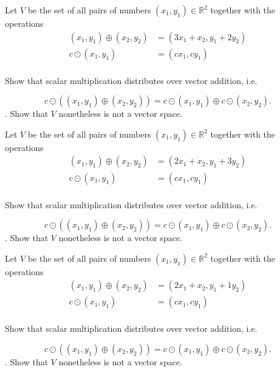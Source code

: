 \documentclass{article}
\begin{document}
\begin{exerciseStatement}
    Let \(V\) be the set of all pairs of numbers \((x_1,y_1)\in\mathbb{R}^2\)  together with the operations
\begin{align*}
(x_1,y_1)\oplus (x_2,y_2)&= (3x_1+x_2, y_1+2y_2)\\
c \odot (x_1,y_1) &= (cx_1,cy_1)\\
\end{align*}

Show that scalar multiplication distributes over vector addition, i.e.

\[c\odot \left((x_1,y_1)\oplus(x_2,y_2)\right)=c\odot(x_1,y_1)\oplus c\odot(x_2,y_2).\]
.
Show that \(V\) nonetheless is not a vector space.



  
\end{exerciseStatement}

\begin{exerciseStatement}
    Let \(V\) be the set of all pairs of numbers \((x_1,y_1)\in\mathbb{R}^2\)  together with the operations
\begin{align*}
(x_1,y_1)\oplus (x_2,y_2)&= (2x_1+x_2, y_1+3y_2)\\
c \odot (x_1,y_1) &= (cx_1,cy_1)\\
\end{align*}

Show that scalar multiplication distributes over vector addition, i.e.

\[c\odot \left((x_1,y_1)\oplus(x_2,y_2)\right)=c\odot(x_1,y_1)\oplus c\odot(x_2,y_2).\]
.
Show that \(V\) nonetheless is not a vector space.



  
\end{exerciseStatement}

\begin{exerciseStatement}
    Let \(V\) be the set of all pairs of numbers \((x_1,y_1)\in\mathbb{R}^2\)  together with the operations
\begin{align*}
(x_1,y_1)\oplus (x_2,y_2)&= (2x_1+x_2, y_1+1y_2)\\
c \odot (x_1,y_1) &= (cx_1,cy_1)\\
\end{align*}

Show that scalar multiplication distributes over vector addition, i.e.

\[c\odot \left((x_1,y_1)\oplus(x_2,y_2)\right)=c\odot(x_1,y_1)\oplus c\odot(x_2,y_2).\]
.
Show that \(V\) nonetheless is not a vector space.



  
\end{exerciseStatement}
\end{document}
